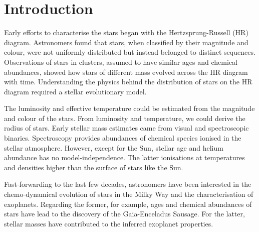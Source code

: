 %
%
%
%
%
\chapter{Introduction}





Early efforts to characterise the stars began with the Hertzsprung-Russell (HR) diagram. Astronomers found that stars, when classified by their magnitude and colour, were not uniformly distributed but instead belonged to distinct sequences. Observations of stars in clusters, assumed to have similar ages and chemical abundances, showed how stars of different mass evolved across the HR diagram with time. Understanding the physics behind the distribution of stars on the HR diagram required a stellar evolutionary model.

 The luminosity and effective temperature could be estimated from the magnitude and colour of the stars. From luminosity and temperature, we could derive the radius of stars. Early stellar mass estimates came from visual and spectroscopic binaries. Spectroscopy provides abundances of chemical species ionised in the stellar atmosphere. However, except for the Sun, stellar age and helium abundance has no model-independence. The latter ionisations at temperatures and densities higher than the surface of stars like the Sun.

Fast-forwarding to the last few decades, astronomers have been interested in the chemo-dynamical evolution of stars in the Milky Way and the characterisation of exoplanets. Regarding the former, for example, ages and chemical abundances of stars have lead to the discovery of the Gaia-Enceladus Sausage. For the latter, stellar masses have contributed to the inferred exoplanet properties.

